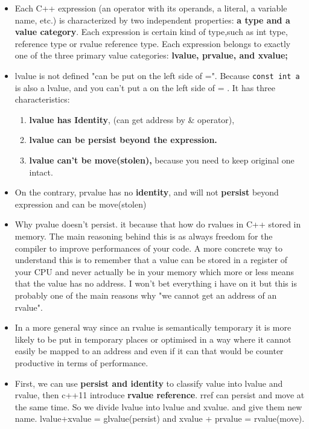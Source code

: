 \documentclass[a4paper,12pt,twoside]{book}
\begin{document}
\begin{itemize}
	\item Each C++ expression (an operator with its operands, a literal, a variable name, etc.) is characterized by two independent properties: \textbf{a type and a value category}. Each expression is certain kind of type,such as int type, reference type or rvalue reference type. Each expression belongs to exactly one of the three primary value categories: \textbf{lvalue, prvalue, and xvalue;} 
	
	\item lvalue is not defined "can be put on the left side of =". Because \texttt{const int a} is also a lvalue, and you can't put a on the left side of = . It has three characteristics:
	\begin{enumerate}
		\item\textbf{lvalue has Identity}, (can get address by \& operator),
		\item \textbf{lvalue can be persist beyond the expression. }
		\item \textbf{lvalue can't be move(stolen),} because you need to keep original one intact.
	\end{enumerate}
	
	\item On the contrary, prvalue has no \textbf{identity}, and will not \textbf{persist} beyond expression and can be move(stolen)
	
	\item Why pvalue doesn't persist. it because that how do rvalues in C++ stored in memory. The main reasoning behind this is as always freedom for the compiler to improve performances of your code. A more concrete way to understand this is to remember that a value can be stored in a register of your CPU and never actually be in your memory which more or less means that the value has no address. I won't bet everything i have on it but this is probably one of the main reasons why "we cannot get an address of an rvalue".
	
	\item In a more general way since an rvalue is semantically temporary it is more likely to be put in temporary places or optimised in a way where it cannot easily be mapped to an address and even if it can that would be counter productive in terms of performance.
	
	\item First, we can use \textbf{persist and identity} to classify value into lvalue and rvalue, then c++11 introduce \textbf{rvalue reference}. rref can persist and move at the same time.  So we divide lvalue into lvalue and xvalue.  and give them new name.  lvalue+xvalue = glvalue(persist)  and xvalue + prvalue = rvalue(move).
	

\end{itemize}
\end{document}
